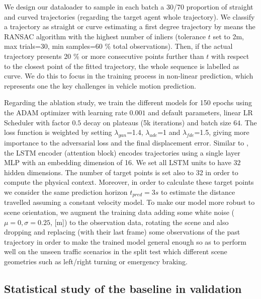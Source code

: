 We design our dataloader to sample in each batch a 30/70 proportion of straight and curved trajectories (regarding the target agent whole trajectory). We classify a trajectory as straight or curve estimating a first degree trajectory by means the RANSAC algorithm with the highest number of inliers (tolerance $t$ set to 2m, max trials=30, min samples=60 \% total observations). Then, if the actual trajectory presents 20 \% or more consecutive points further than $t$ with respect to the closest point of the fitted trajectory, the whole sequence is labelled as curve. We do this to focus in the training process in non-linear prediction, which represents one the key challenges in vehicle motion prediction. 

Regarding the ablation study, we train the different models for 150 epochs using the ADAM optimizer with learning rate $0.001$ and default parameters, linear LR Scheduler with factor $0.5$ decay on plateaus (5k iterations) and batch size $64$. The loss function is weighted by setting $\lambda_{gan}$=1.4, $\lambda_{ade}$=1 and $\lambda_{fde}$=1.5, giving more importance to the adversarial loss and the final displacement error. Similar to \cite{sadeghian2019sophie}, the LSTM encoder (attention block) encodes trajectories using a single layer MLP with an embedding dimension of 16. We set all LSTM units to have $32$ hidden dimensions. The number of target points is set also to 32 in order to compute the physical context. Moreover, in order to calculate these target points we consider the same prediction horizon $t_{pred}=3s$ to estimate the distance travelled assuming a constant velocity model. To make our model more robust to scene orientation, we augment the training data adding some white noise ($\mu=0, \sigma=0.25$, [m]) to the observation data, rotating the scene and also dropping and replacing (with their last frame) some observations of the past trajectory in order to make the trained model general enough so as to perform well on the unseen traffic scenarios in the split test which different scene geometries such as left/right turning or emergency braking.%

\subsection{Statistical study of the baseline in validation}
\label{subsec:5_target_agent_distribution}

